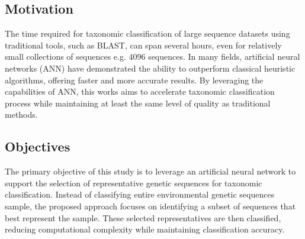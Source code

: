 \documentclass[pdflatex,sn-vancouver-num]{sn-jnl}%
\begin{document}
        \subsection{Motivation}
            The time required for taxonomic classification of large sequence datasets using traditional tools, such as BLAST, can span several hours, even for relatively small collections of sequences e.g. 4096 sequences. In many fields, artificial neural networks (ANN) have demonstrated the ability to outperform classical heuristic algorithms, offering faster and more accurate results. By leveraging the capabilities of ANN, this works aims to accelerate taxonomic classification process while maintaining at least the same level of quality as traditional methods.

        \subsection{Objectives}
            The primary objective of this study is to leverage an artificial neural network to support the selection of representative genetic sequences for taxonomic classification. Instead of classifying entire environmental genetic sequences sample, the proposed approach focuses on identifying a subset of sequences that best represent the sample. These selected representatives are then classified, reducing computational complexity while maintaining classification accuracy.



\end{document}
